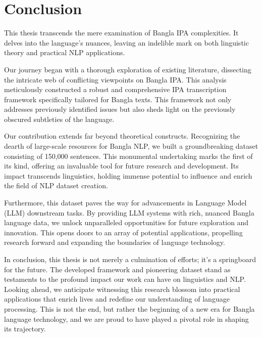 \chapter{Conclusion}
\label{sec:conclusion}

This thesis transcends the mere examination of Bangla IPA complexities. It delves into the language's nuances, leaving an indelible mark on both linguistic theory and practical NLP applications.

Our journey began with a thorough exploration of existing literature, dissecting the intricate web of conflicting viewpoints on Bangla IPA. This analysis meticulously constructed a robust and comprehensive IPA transcription framework specifically tailored for Bangla texts. This framework not only addresses previously identified issues but also sheds light on the previously obscured subtleties of the language.

Our contribution extends far beyond theoretical constructs. Recognizing the dearth of large-scale resources for Bangla NLP, we built a groundbreaking dataset consisting of 150,000 sentences. This monumental undertaking marks the first of its kind, offering an invaluable tool for future research and development. Its impact transcends linguistics, holding immense potential to influence and enrich the field of NLP dataset creation.

Furthermore, this dataset paves the way for advancements in Language Model (LLM) downstream tasks. By providing LLM systems with rich, nuanced Bangla language data, we unlock unparalleled opportunities for future exploration and innovation. This opens doors to an array of potential applications, propelling research forward and expanding the boundaries of language technology.

In conclusion, this thesis is not merely a culmination of efforts; it's a springboard for the future. The developed framework and pioneering dataset stand as testaments to the profound impact our work can have on linguistics and NLP. Looking ahead, we anticipate witnessing this research blossom into practical applications that enrich lives and redefine our understanding of language processing. This is not the end, but rather the beginning of a new era for Bangla language technology, and we are proud to have played a pivotal role in shaping its trajectory.


